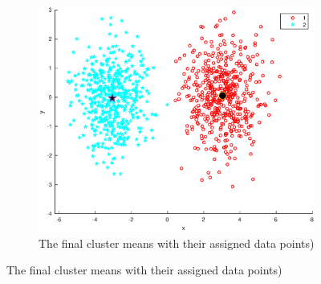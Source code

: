 \documentclass[10pt]{article}
\begin{document}
\begin{figure}[H]
\begin{subfigure}[b]{.45\textwidth}
    \includegraphics[width=\columnwidth]{Fig2_k2.eps}
    \caption{The final cluster means with their assigned data points)}
    \label{fig1b}
  \end{subfigure}
  \label{fig1.1}
\end{figure}
\end{document}
